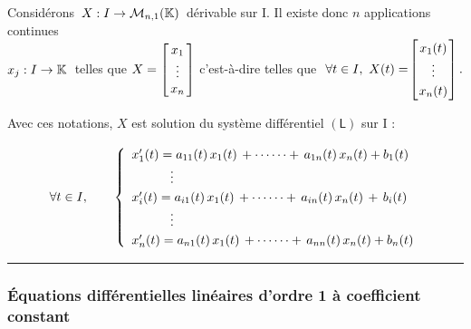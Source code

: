 \vspace{1.1cm}

Considérons \(\,X:I\to\mathcal{M}_{n,1}(\mathbb{K})\,\) dérivable sur I. Il existe donc $n$ applications continues\\
\(x_j:I\to \mathbb{K} \: \) telles que \(X=\arraycolsep=0.05cm\def\arraystretch{1} \left[
\begin{array}{c}
    x_1\\
    \vdots\\
    x_n
\end{array}    
\right]\) c'est-à-dire telles que \(\ \forall t \in I,\ X(t)=\!\arraycolsep=0.03cm\def\arraystretch{1.2}\left[
    \begin{array}{c}
        x_1(t)\\
        \vdots\\
        x_n(t)
    \end{array}    
    \right].\)

\vspace{1cm}

Avec ces notations, $X$ est solution du système différentiel $(\mathsf{L})$ sur I \ssi :\vspace{0.2cm}

\[\forall t\in I, \qquad \left\{\def\arraystretch{1.2}
\begin{array}{l}
    x'_1(t)=a_{11}(t)\,x_1(t)\,+\cdots\cdots+\,a_{1n}(t)\,x_n(t)+b_1(t)\\
    \hspace{1.07cm} \vdots\\
    x'_i(t)=a_{i1}(t)\,x_1(t)\,+\cdots\cdots+\,a_{in}(t)\,x_n(t)\,+\,b_i(t)\\
    \hspace{1.07cm} \vdots\\
    x'_n(t)=a_{n1}(t)\,x_1(t)\,+\cdots\cdots+\,a_{nn}(t)\,x_n(t)+b_n(t)
\end{array}
\right.\]

\vspace{1cm}

\hrule

\newpage

\subsubsection[EDLO1 à coefficient constant]{Équations différentielles linéaires d'ordre 1 à coefficient constant}

\vspace{0.7cm}

